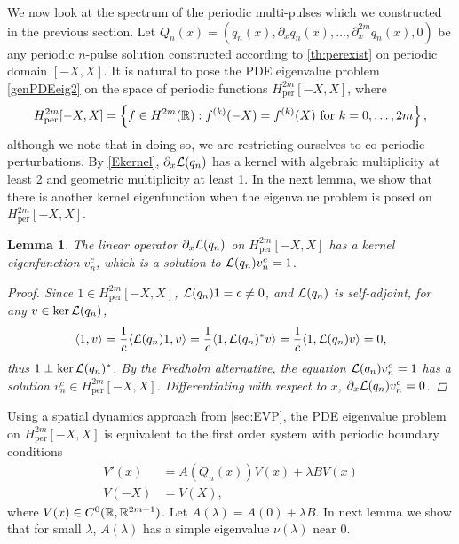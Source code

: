 \documentclass[10pt,reqno]{amsart}
\theoremstyle{plain}
\newtheorem{lemma}[theorem]{Lemma}
\theoremstyle{definition}
\theoremstyle{remark}
\numberwithin{theorem}{section}
\numberwithin{equation}{section}
\begin{document}
We now look at the spectrum of the periodic multi-pulses which we constructed in the previous section. Let $Q_n(x) = (q_n(x), \partial_x q_n(x), \dots, \partial_x^{2m} q_n(x), 0)$ be any periodic $n$-pulse solution constructed according to \cref{th:perexist} on periodic domain $[-X, X]$. It is natural to pose the PDE eigenvalue problem \cref{genPDEeig2} on the space of periodic functions $H^{2m}_{\text{per}}[-X,X]$, where
\[
H^{2m}_{\text{per}}[-X,X] = \left\{ f \in H^{2m}(\mathbb{R}) : f^{(k)}(-X) = f^{(k)}(X) \text{ for } k = 0, \dots, 2m \right\},
\]
although we note that in doing so, we are restricting ourselves to co-periodic perturbations. By \cref{Ekernel}, $\partial_x \mathcal{L}(q_n)$ has a kernel with algebraic multiplicity at least 2 and geometric multiplicity at least 1. In the next lemma, we show that there is another kernel eigenfunction when the eigenvalue problem is posed on $H^{2m}_{\text{per}}[-X,X]$. 

\begin{lemma}\label{qnkernel}
The linear operator $\partial_x \mathcal{L}(q_n)$ on $H^{2m}_{\text{per}}[-X,X]$ has a kernel eigenfunction $v_n^c$, which is a solution to $\mathcal{L}(q_n)v_n^c = 1$.
\begin{proof}
Since $1 \in H^{2m}_{\text{per}}[-X,X]$, $\mathcal{L}(q_n) 1 = c \neq 0$, and $\mathcal{L}(q_n)$ is self-adjoint, for any $v \in \mathop\mathrm{ker}\nolimits \mathcal{L}(q_n)$,
\begin{align*}
\langle 1, v \rangle = \frac{1}{c} \langle \mathcal{L}(q_n) 1, v \rangle
= \frac{1}{c} \langle  1, \mathcal{L}(q_n)^* v \rangle = \frac{1}{c} \langle  1, \mathcal{L}(q_n) v \rangle = 0,
\end{align*}
thus $1 \perp \mathop\mathrm{ker}\nolimits \mathcal{L}(q_n)^*$. By the Fredholm alternative, the equation $\mathcal{L}(q_n) v_n^c = 1$ has a solution $v_n^c \in H^{2m}_{\text{per}}[-X,X]$. Differentiating with respect to $x$, $\partial_x \mathcal{L}(q_n) v_n^c = 0$.
\end{proof}
\end{lemma}

\noi Using a spatial dynamics approach from \cref{sec:EVP}, the PDE eigenvalue problem on $H^{2m}_{\text{per}}[-X,X]$ is equivalent to the first order system with periodic boundary conditions
\begin{equation}\label{PDEeigsystemper3}
\begin{aligned}
V'(x) &= A(Q_n(x))V(x) + \lambda B V(x) \\
V(-X) &= V(X),
\end{aligned}
\end{equation}
where $V(x) \in C^0(\mathbb{R},\mathbb{R}^{2m+1})$. Let $A(\lambda) = A(0) + \lambda B$. In next lemma we show that for small $\lambda$, $A(\lambda)$ has a simple eigenvalue $\nu(\lambda)$ near 0.
\end{document}
